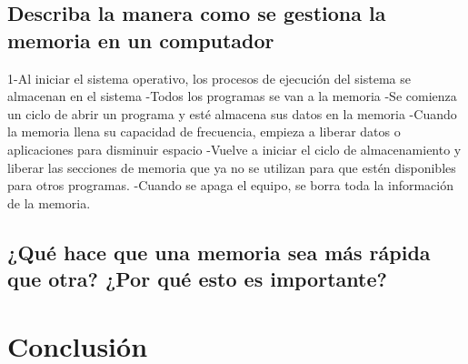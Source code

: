 \documentclass{article}
\begin{document}
    
    \subsection{Describa la manera como se gestiona la memoria en un computador}
    1-Al iniciar el sistema operativo, los procesos de ejecución del sistema se almacenan en el sistema -Todos los programas se van a la memoria -Se comienza un ciclo de abrir un programa y esté almacena sus datos en la memoria -Cuando la memoria llena su capacidad de frecuencia, empieza a liberar datos o aplicaciones para disminuir espacio -Vuelve a iniciar el ciclo de almacenamiento y  liberar las secciones de memoria que ya no se utilizan para que estén disponibles para otros programas. -Cuando se apaga el equipo, se borra toda la información de la memoria. \newline
    
    \subsection{¿Qué hace que una memoria sea más rápida que otra? ¿Por qué esto es importante?}



\section{Conclusión} \label{conclulsion}



\end{document}
